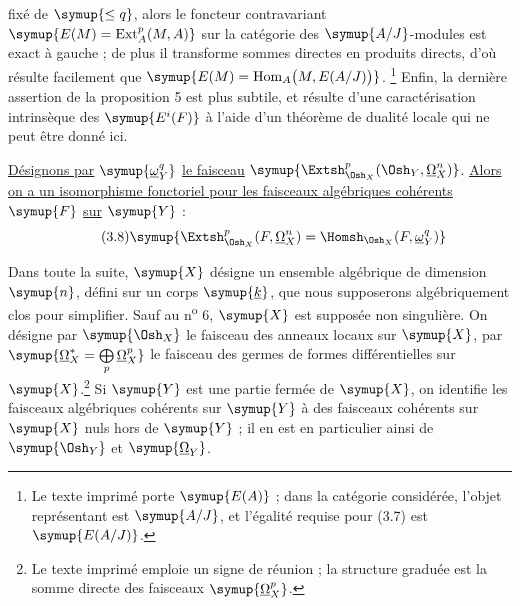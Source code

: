 fixé de  $\symup{\leq q}$, alors le foncteur contravariant
$\symup{E(M)=\operatorname{Ext}_{A}^{p}(M,A)}$ sur la catégorie des $\symup{A/J}$-modules est
exact à gauche ; de plus il transforme sommes directes en produits directs,
d'où résulte facilement que
$\symup{E(M)=\operatorname{Hom}_{A}\bigl(M,E(A/J)\bigr)}$.
\footnote{Le texte imprimé porte $\symup{E(A)}$ ; dans la catégorie considérée, l'objet
représentant est $\symup{A/J}$, et l'égalité requise pour (3.7) est $\symup{E(A/J)}$.} Enfin, la
dernière assertion de la proposition 5 est plus subtile, et résulte d'une
caractérisation intrinsèque des $\symup{E^{i}(F)}$ à l'aide d'un théorème de dualité
locale qui ne peut être donné ici.

 \uline{Désignons par} $\symup{\underline{\omega}_Y^{q}}$ \uline{le faisceau}
$\symup{\Extsh_{\Osh_X}^{p}(\Osh_Y,\underline{\Omega}_X^{n})}$. \uline{Alors on a un isomorphisme
fonctoriel pour les faisceaux algébriques cohérents} $\symup{F}$ \uline{sur} $\symup{Y}$ :
\begin{equation}\tag{3.8}
  \symup{\Extsh_{\Osh_X}^{p}(F,\underline{\Omega}_X^{n})
  =\Homsh_{\Osh_X}(F,\underline{\omega}_Y^{q})}
\end{equation}


Dans toute la suite, $\symup{X}$ désigne un ensemble algébrique de dimension $\symup{n}$, défini
sur un corps $\symup{\underline{k}}$, que nous supposerons algébriquement clos pour simplifier. Sauf
au n\textsuperscript{o} 6, $\symup{X}$ est supposée non singulière. On désigne par
$\symup{\Osh_X}$ le faisceau des anneaux locaux sur $\symup{X}$, par
$\symup{\underline{\Omega}_X^{*}=\bigoplus\limits_p\underline{\Omega}_X^{p}}$ le faisceau des germes de formes différentielles sur $\symup{X}$.\footnote{Le texte
imprimé emploie un signe de réunion ; la structure graduée est la somme directe
des faisceaux $\symup{\underline{\Omega}_X^p}$.} Si $\symup{Y}$ est une partie fermée de $\symup{X}$, on identifie
les faisceaux algébriques cohérents sur $\symup{Y}$ à des faisceaux cohérents sur $\symup{X}$
nuls hors de $\symup{Y}$ ; il en est en particulier ainsi de $\symup{\Osh_Y}$ et $\symup{\underline{\Omega}_Y}$.

